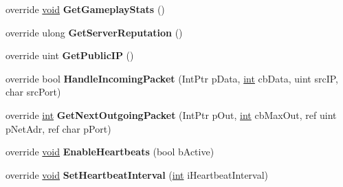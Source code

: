 \begin{DoxyCompactItemize}
\item 
\hypertarget{classValve_1_1Steamworks_1_1CSteamGameServer_a51bf3f0744ad4a86eabd7a863cd8be59}{}override \hyperlink{SDL__audio_8h_a52835ae37c4bb905b903cbaf5d04b05f}{void} {\bfseries Get\+Gameplay\+Stats} ()\label{classValve_1_1Steamworks_1_1CSteamGameServer_a51bf3f0744ad4a86eabd7a863cd8be59}

\item 
\hypertarget{classValve_1_1Steamworks_1_1CSteamGameServer_a0b3b6e46a7ccc9c2b799b3a1b65933a2}{}override ulong {\bfseries Get\+Server\+Reputation} ()\label{classValve_1_1Steamworks_1_1CSteamGameServer_a0b3b6e46a7ccc9c2b799b3a1b65933a2}

\item 
\hypertarget{classValve_1_1Steamworks_1_1CSteamGameServer_a00679290777a12e405028d5ad9b8a2ca}{}override uint {\bfseries Get\+Public\+I\+P} ()\label{classValve_1_1Steamworks_1_1CSteamGameServer_a00679290777a12e405028d5ad9b8a2ca}

\item 
\hypertarget{classValve_1_1Steamworks_1_1CSteamGameServer_a286835ffaff6a8d6c78b0d80140cc941}{}override bool {\bfseries Handle\+Incoming\+Packet} (Int\+Ptr p\+Data, \hyperlink{SDL__thread_8h_a6a64f9be4433e4de6e2f2f548cf3c08e}{int} cb\+Data, uint src\+I\+P, char src\+Port)\label{classValve_1_1Steamworks_1_1CSteamGameServer_a286835ffaff6a8d6c78b0d80140cc941}

\item 
\hypertarget{classValve_1_1Steamworks_1_1CSteamGameServer_a5d402300d1bb24ba2475692a6e54fbfb}{}override \hyperlink{SDL__thread_8h_a6a64f9be4433e4de6e2f2f548cf3c08e}{int} {\bfseries Get\+Next\+Outgoing\+Packet} (Int\+Ptr p\+Out, \hyperlink{SDL__thread_8h_a6a64f9be4433e4de6e2f2f548cf3c08e}{int} cb\+Max\+Out, ref uint p\+Net\+Adr, ref char p\+Port)\label{classValve_1_1Steamworks_1_1CSteamGameServer_a5d402300d1bb24ba2475692a6e54fbfb}

\item 
\hypertarget{classValve_1_1Steamworks_1_1CSteamGameServer_a84215cbc66d99677bed1dd08ed40739a}{}override \hyperlink{SDL__audio_8h_a52835ae37c4bb905b903cbaf5d04b05f}{void} {\bfseries Enable\+Heartbeats} (bool b\+Active)\label{classValve_1_1Steamworks_1_1CSteamGameServer_a84215cbc66d99677bed1dd08ed40739a}

\item 
\hypertarget{classValve_1_1Steamworks_1_1CSteamGameServer_a5417f3417fe953efb30bc143e3c00e89}{}override \hyperlink{SDL__audio_8h_a52835ae37c4bb905b903cbaf5d04b05f}{void} {\bfseries Set\+Heartbeat\+Interval} (\hyperlink{SDL__thread_8h_a6a64f9be4433e4de6e2f2f548cf3c08e}{int} i\+Heartbeat\+Interval)\label{classValve_1_1Steamworks_1_1CSteamGameServer_a5417f3417fe953efb30bc143e3c00e89}


\end{DoxyCompactItemize}
